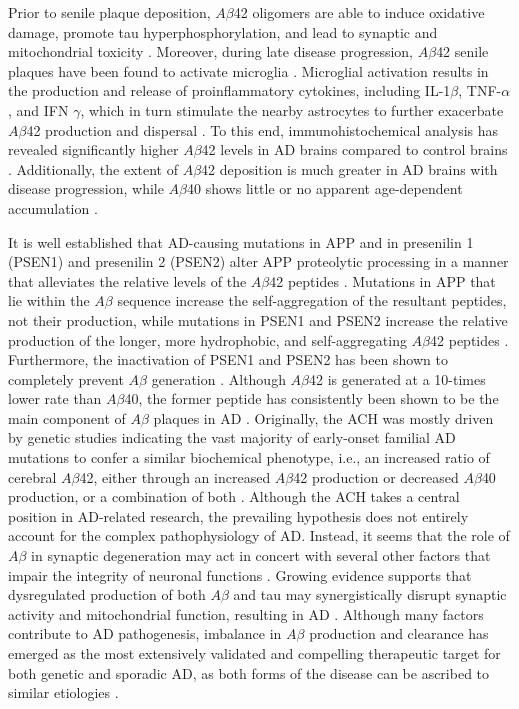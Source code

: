 Prior to senile plaque deposition, $A\beta$42 oligomers are able to induce oxidative damage, promote tau hyperphosphorylation, and lead to synaptic and mitochondrial toxicity \citep{Kaminsky2015,Lustbader2004}. Moreover, during late disease progression, $A\beta$42 senile plaques have been found to activate microglia \citep{Rosenmann2013}. Microglial activation results in the production and release of proinflammatory cytokines, including IL-1$\beta$, TNF-$\alpha$, and IFN $\gamma$, which in turn stimulate the nearby astrocytes to further exacerbate $A\beta$42 production and dispersal \citep{DalPra2015}. To this end, immunohistochemical analysis has revealed significantly higher $A\beta$42 levels in AD brains compared to control brains \citep{Funato1998}. Additionally, the extent of $A\beta$42 deposition is much greater in AD brains with disease progression, while $A\beta$40 shows little or no apparent age-dependent accumulation \citep{Funato1998}.

It is well established that AD-causing mutations in APP and in presenilin 1 (PSEN1) and presenilin 2 (PSEN2) alter APP proteolytic processing in a manner that alleviates the relative levels of the $A\beta$42 peptides \citep{Borchelt1996,Scheuner1996}. Mutations in APP that lie within the $A\beta$ sequence increase the self-aggregation of the resultant peptides, not their production, while mutations in PSEN1 and PSEN2 increase the relative production of the longer, more hydrophobic, and self-aggregating $A\beta$42 peptides \citep{Kim2008,Weggen2012}. Furthermore, the inactivation of PSEN1 and PSEN2 has been shown to completely prevent $A\beta$ generation \citep{Herreman2000,Zhang2000}. Although $A\beta$42 is generated at a 10-times lower rate than $A\beta$40, the former peptide has consistently been shown to be the main component of $A\beta$ plaques in AD \citep{Iwatsubo1994}. Originally, the ACH was mostly driven by genetic studies indicating the vast majority of early-onset familial AD mutations to confer a similar biochemical phenotype, i.e., an increased ratio of cerebral $A\beta$42, either through an increased $A\beta$42 production or decreased $A\beta$40 production, or a combination of both \citep{Cavallucci2012,Cruts1998}. Although the ACH takes a central position in AD-related research, the prevailing hypothesis does not entirely account for the complex pathophysiology of AD. Instead, it seems that the role of $A\beta$ in synaptic degeneration may act in concert with several other factors that impair the integrity of neuronal functions \citep{anand2014,DalPra2015}. Growing evidence supports that dysregulated production of both $A\beta$ and tau may synergistically disrupt synaptic activity and mitochondrial function, resulting in AD \citep{Chetelat2013,Musiek2015,Quintanilla2012,Teplow2013}. Although many factors contribute to AD pathogenesis, imbalance in $A\beta$ production and clearance has emerged as the most extensively validated and compelling therapeutic target for both genetic and sporadic AD, as both forms of the disease can be ascribed to similar etiologies \citep{Selkoe2012,Selkoe2016}.

